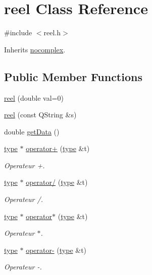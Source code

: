 \hypertarget{classreel}{\section{reel Class Reference}
\label{classreel}
}


{\ttfamily \#include $<$reel.\-h$>$}



Inherits \hyperlink{classnocomplex}{nocomplex}.

\subsection*{Public Member Functions}
\begin{DoxyCompactItemize}
\item 
\hyperlink{classreel_af400a93dfd7cfa7447f8751ab32c48fc}{reel} (double val=0)
\item 
\hyperlink{classreel_a6399912ce32c14c918ce5b6fb0b294dc}{reel} (const Q\-String \&s)
\item 
double \hyperlink{classreel_ad1d16e6ce54fc6b8844757a8f04300ca}{get\-Data} ()
\item 
\hyperlink{classtype}{type} $\ast$ \hyperlink{classreel_af2ae884e68ab28b286cf9940f05f59d9}{operator+} (\hyperlink{classtype}{type} \&t)
\begin{DoxyCompactList}\small\item\em Operateur +. \end{DoxyCompactList}\item 
\hyperlink{classtype}{type} $\ast$ \hyperlink{classreel_a3bc55f29b377547040d47be018b73fe6}{operator/} (\hyperlink{classtype}{type} \&t)
\begin{DoxyCompactList}\small\item\em Operateur /. \end{DoxyCompactList}\item 
\hyperlink{classtype}{type} $\ast$ \hyperlink{classreel_a044791a71fd9926cbedf3f19f6eea122}{operator$\ast$} (\hyperlink{classtype}{type} \&t)
\begin{DoxyCompactList}\small\item\em Operateur $\ast$. \end{DoxyCompactList}\item 
\hyperlink{classtype}{type} $\ast$ \hyperlink{classreel_a9cd96b762004392eda5216262201322c}{operator-\/} (\hyperlink{classtype}{type} \&t)
\begin{DoxyCompactList}\small\item\em Operateur -\/. \end{DoxyCompactList}\item 

\end{DoxyCompactItemize}

